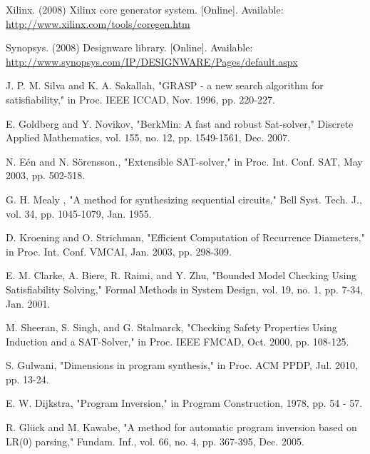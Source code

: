 \documentclass[journal]{IEEEtran}
\begin{document}
{\begin{thebibliography}{1}
Xilinx. (2008) Xilinx core generator system. [Online]. Available:
  \url{http://www.xilinx.com/tools/coregen.htm}


Synopsys. (2008) Designware library. [Online]. Available:
  \url{http://www.synopsys.com/IP/DESIGNWARE/Pages/default.aspx}


J. P. M. Silva and K. A. Sakallah,
"GRASP - a new search algorithm for satisfiability,"
in Proc. IEEE ICCAD, Nov. 1996, pp. 220-227.


E. Goldberg and Y. Novikov,
"BerkMin: A fast and robust Sat-solver,"
Discrete Applied Mathematics,
vol. 155, no. 12,
pp. 1549-1561, Dec. 2007.

N. E\'en and N. S\"orensson.,
"Extensible SAT-solver,"
in Proc. Int. Conf.
SAT, May 2003, pp. 502-518.

G. H. Mealy , "A method for synthesizing sequential circuits," Bell Syst.
Tech. J., vol. 34, pp. 1045-1079, Jan. 1955.


D. Kroening and O. Strichman,
"Efficient Computation of Recurrence Diameters,"
in Proc. Int. Conf. VMCAI, Jan. 2003,
pp. 298-309.



% 




E. M. Clarke, A. Biere, R. Raimi, and Y. Zhu,
"Bounded Model Checking Using Satisfiability Solving,"
Formal Methods in System Design,
vol. 19, no. 1,
pp. 7-34, Jan. 2001.



M. Sheeran, S. Singh, and G. Stalmarck,
"Checking Safety Properties Using Induction and a SAT-Solver,"
in Proc. IEEE FMCAD, Oct. 2000, pp. 108-125.





S. Gulwani,
"Dimensions in program synthesis,"
in Proc. ACM PPDP, Jul. 2010, pp. 13-24.



E. W. Dijkstra,
"Program Inversion,"
in Program Construction,
1978,
pp. 54 - 57.


R. Gl\"{u}ck and M. Kawabe,
"A method for automatic program inversion based on LR(0) parsing,"
Fundam. Inf.,
vol. 66, no. 4,
pp. 367-395, Dec. 2005.



\end{thebibliography}}
\end{document}
